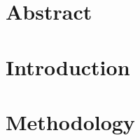 \documentclass[a4paper,10pt]{article}
\author{\me}
\begin{document}


\normalsize


%

%

\section*{Abstract}\label{chapter:abstract}


%



\section{Introduction}\label{chapter:introduction}
\setcounter{page}{0}


\section{Methodology}\label{chapter:methodology}


% 
\end{document}
